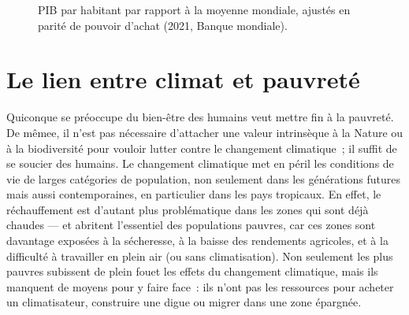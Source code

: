 \documentclass[a5paper,french]{memoir}
\begin{document}
\begin{figure}[h!]
  \caption{PIB par habitant par rapport à la moyenne mondiale, ajustés en parité de pouvoir d'achat (2021, Banque mondiale). %
  }\label{fig:GDPpc}
\end{figure}

\section{Le lien entre climat et pauvreté}

Quiconque se préoccupe du bien-être des humains veut mettre fin à la pauvreté. 
De mêmee, il n'est pas nécessaire d'attacher une valeur intrinsèque à la Nature ou à la biodiversité pour vouloir lutter contre le changement climatique~; il suffit de se soucier des humains. Le changement climatique met en péril les conditions de vie de larges catégories de population, non seulement dans les générations futures mais aussi contemporaines, en particulier dans les pays tropicaux. En effet, le réchauffement est d'autant plus problématique dans les zones qui sont déjà chaudes --- et abritent l'essentiel des populations pauvres, car ces zones sont davantage exposées à la sécheresse, à la baisse des rendements agricoles, et à la difficulté à travailler en plein air (ou sans climatisation). Non seulement les plus pauvres subissent de plein fouet les effets du changement climatique, mais ils manquent de moyens pour y faire face~: %
ils n'ont pas les ressources pour acheter un climatisateur, construire une digue ou migrer dans une zone épargnée. 

\end{document}

